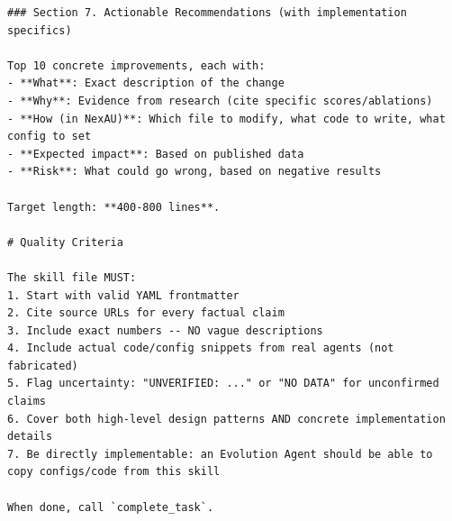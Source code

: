 \begin{tcolorbox}
\begin{lstlisting}
### Section 7. Actionable Recommendations (with implementation specifics)

Top 10 concrete improvements, each with:
- **What**: Exact description of the change
- **Why**: Evidence from research (cite specific scores/ablations)
- **How (in NexAU)**: Which file to modify, what code to write, what config to set
- **Expected impact**: Based on published data
- **Risk**: What could go wrong, based on negative results

Target length: **400-800 lines**.

# Quality Criteria

The skill file MUST:
1. Start with valid YAML frontmatter
2. Cite source URLs for every factual claim
3. Include exact numbers -- NO vague descriptions
4. Include actual code/config snippets from real agents (not fabricated)
5. Flag uncertainty: "UNVERIFIED: ..." or "NO DATA" for unconfirmed claims
6. Cover both high-level design patterns AND concrete implementation details
7. Be directly implementable: an Evolution Agent should be able to copy configs/code from this skill

When done, call `complete_task`.
\end{lstlisting}
\end{tcolorbox}


